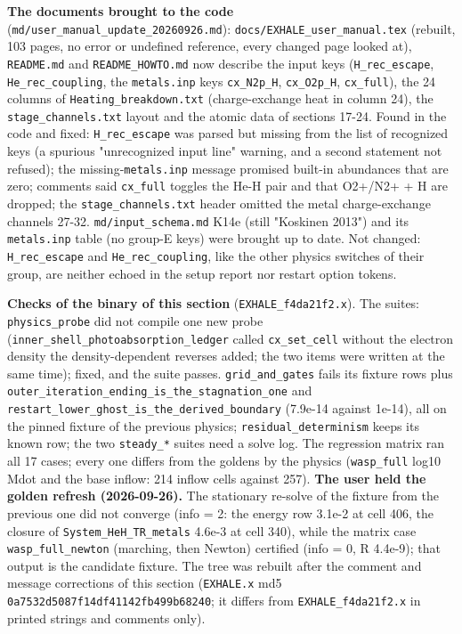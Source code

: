 \documentclass[english,a4paper]{my_memo}
\begin{document}
\textbf{The documents brought to the code} (\texttt{md/user\_manual\_update\_20260926.md}):
\texttt{docs/EXHALE\_user\_manual.tex} (rebuilt, 103 pages, no error or undefined
reference, every changed page looked at), \texttt{README.md} and \texttt{README\_HOWTO.md}
now describe the input keys (\texttt{H\_rec\_escape}, \texttt{He\_rec\_coupling}, the
\texttt{metals.inp} keys \texttt{cx\_N2p\_H}, \texttt{cx\_O2p\_H}, \texttt{cx\_full}), the 24 columns of
\texttt{Heating\_breakdown.txt} (charge-exchange heat in column 24), the
\texttt{stage\_channels.txt} layout and the atomic data of sections 17-24. Found in
the code and fixed: \texttt{H\_rec\_escape} was parsed but missing from the list of
recognized keys (a spurious "unrecognized input line" warning, and a second
statement not refused); the missing-\texttt{metals.inp} message promised built-in
abundances that are zero; comments said \texttt{cx\_full} toggles the He-H pair and
that O2+/N2+ + H are dropped; the \texttt{stage\_channels.txt} header omitted the
metal charge-exchange channels 27-32. \texttt{md/input\_schema.md} K14e (still
"Koskinen 2013") and its \texttt{metals.inp} table (no group-E keys) were brought up
to date. Not changed: \texttt{H\_rec\_escape} and \texttt{He\_rec\_coupling}, like the other
physics switches of their group, are neither echoed in the setup report nor
restart option tokens.

\textbf{Checks of the binary of this section} (\texttt{EXHALE\_f4da21f2.x}). The suites:
\texttt{physics\_probe} did not compile one new probe (\texttt{inner\_shell\_photoabsorption\_ledger}
called \texttt{cx\_set\_cell} without the electron density the density-dependent
reverses added; the two items were written at the same time); fixed, and the
suite passes. \texttt{grid\_and\_gates} fails its fixture rows plus
\texttt{outer\_iteration\_ending\_is\_the\_stagnation\_one} and
\texttt{restart\_lower\_ghost\_is\_the\_derived\_boundary} (7.9e-14 against 1e-14), all on
the pinned fixture of the previous physics; \texttt{residual\_determinism} keeps its
known row; the two \texttt{steady\_*} suites need a solve log. The regression matrix
ran all 17 cases; every one differs from the goldens by the physics
(\texttt{wasp\_full} log10 Mdot and the base inflow: 214 inflow cells against 257).
\textbf{The user held the golden refresh (2026-09-26).} The stationary re-solve
of the fixture from the previous one did not converge (info = 2: the energy
row 3.1e-2 at cell 406, the closure of \texttt{System\_HeH\_TR\_metals} 4.6e-3 at cell
340), while the matrix case \texttt{wasp\_full\_newton} (marching, then Newton)
certified (info = 0, \textbar\textbar R\textbar\textbar{} 4.4e-9); that output is the candidate fixture.
The tree was rebuilt after the comment and message corrections of this
section (\texttt{EXHALE.x} md5 \texttt{0a7532d5087f14df41142fb499b68240}; it differs from
\texttt{EXHALE\_f4da21f2.x} in printed strings and comments only).
\end{document}
